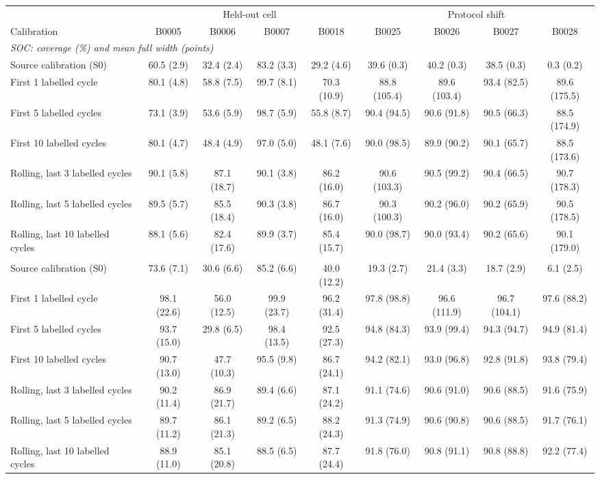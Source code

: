\begin{tabular}{lcccccccc}
\toprule
 & \multicolumn{4}{c}{Held-out cell} & \multicolumn{4}{c}{Protocol shift} \\
\cmidrule(lr){2-5}\cmidrule(lr){6-9}
Calibration & B0005 & B0006 & B0007 & B0018 & B0025 & B0026 & B0027 & B0028 \\
\midrule
\multicolumn{9}{l}{\textit{SOC: coverage (\%) and mean full width (points)}} \\
Source calibration (S0) & 60.5 (2.9) & 32.4 (2.4) & 83.2 (3.3) & 29.2 (4.6) & 39.6 (0.3) & 40.2 (0.3) & 38.5 (0.3) & 0.3 (0.2) \\
First 1 labelled cycle & 80.1 (4.8) & 58.8 (7.5) & 99.7 (8.1) & 70.3 (10.9) & 88.8 (105.4) & 89.6 (103.4) & 93.4 (82.5) & 89.6 (175.5) \\
First 5 labelled cycles & 73.1 (3.9) & 53.6 (5.9) & 98.7 (5.9) & 55.8 (8.7) & 90.4 (94.5) & 90.6 (91.8) & 90.5 (66.3) & 88.5 (174.9) \\
First 10 labelled cycles & 80.1 (4.7) & 48.4 (4.9) & 97.0 (5.0) & 48.1 (7.6) & 90.0 (98.5) & 89.9 (90.2) & 90.1 (65.7) & 88.5 (173.6) \\
Rolling, last 3 labelled cycles & 90.1 (5.8) & 87.1 (18.7) & 90.1 (3.8) & 86.2 (16.0) & 90.6 (103.3) & 90.5 (99.2) & 90.4 (66.5) & 90.7 (178.3) \\
Rolling, last 5 labelled cycles & 89.5 (5.7) & 85.5 (18.4) & 90.3 (3.8) & 86.7 (16.0) & 90.3 (100.3) & 90.2 (96.0) & 90.2 (65.9) & 90.5 (178.5) \\
Rolling, last 10 labelled cycles & 88.1 (5.6) & 82.4 (17.6) & 89.9 (3.7) & 85.4 (15.7) & 90.0 (98.7) & 90.0 (93.4) & 90.2 (65.6) & 90.1 (179.0) \\
\addlinespace
\multicolumn{9}{l}{\textit{SOH: coverage (\%) and mean full width (points)}} \\
Source calibration (S0) & 73.6 (7.1) & 30.6 (6.6) & 85.2 (6.6) & 40.0 (12.2) & 19.3 (2.7) & 21.4 (3.3) & 18.7 (2.9) & 6.1 (2.5) \\
First 1 labelled cycle & 98.1 (22.6) & 56.0 (12.5) & 99.9 (23.7) & 96.2 (31.4) & 97.8 (98.8) & 96.6 (111.9) & 96.7 (104.1) & 97.6 (88.2) \\
First 5 labelled cycles & 93.7 (15.0) & 29.8 (6.5) & 98.4 (13.5) & 92.5 (27.3) & 94.8 (84.3) & 93.9 (99.4) & 94.3 (94.7) & 94.9 (81.4) \\
First 10 labelled cycles & 90.7 (13.0) & 47.7 (10.3) & 95.5 (9.8) & 86.7 (24.1) & 94.2 (82.1) & 93.0 (96.8) & 92.8 (91.8) & 93.8 (79.4) \\
Rolling, last 3 labelled cycles & 90.2 (11.4) & 86.9 (21.7) & 89.4 (6.6) & 87.1 (24.2) & 91.1 (74.6) & 90.6 (91.0) & 90.6 (88.5) & 91.6 (75.9) \\
Rolling, last 5 labelled cycles & 89.7 (11.2) & 86.1 (21.3) & 89.2 (6.5) & 88.2 (24.3) & 91.3 (74.9) & 90.6 (90.8) & 90.6 (88.5) & 91.7 (76.1) \\
Rolling, last 10 labelled cycles & 88.9 (11.0) & 85.1 (20.8) & 88.5 (6.5) & 87.7 (24.4) & 91.8 (76.0) & 90.8 (91.1) & 90.8 (88.8) & 92.2 (77.4) \\
\bottomrule
\end{tabular}
